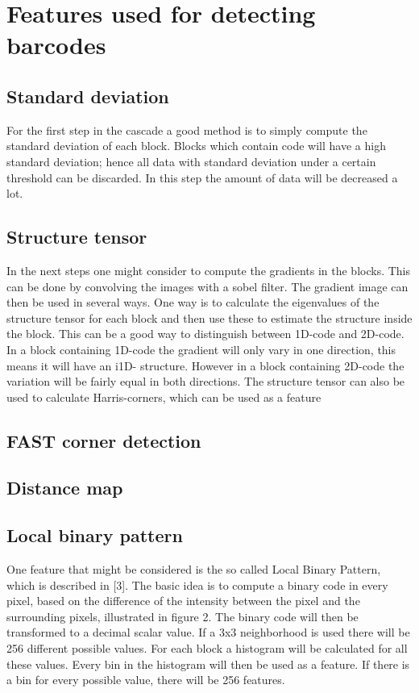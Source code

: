 \chapter{Features used for detecting barcodes}
\label{sec:Features used for detecting barcodes}

\section{Standard deviation}
\label{sec:Standard deviation}
For the first step in the cascade a good method is to simply compute the standard deviation of each block. Blocks which contain code will have a high standard deviation; hence all data with standard deviation under a certain threshold can be discarded. In this step the amount of data will be decreased a lot. 

\section{Structure tensor}
\label{sec:Structure tensor}
In the next steps one might consider to compute the gradients in the blocks. This can be done by convolving the images with a sobel filter. The gradient image can then be used in several ways. One way is to calculate the eigenvalues of the structure tensor for each block and then use these to estimate the
structure inside the block. This can be a good way to distinguish between 1D-code and 2D-code.  In a block containing 1D-code the gradient will only vary in one direction, this means it will have an i1D- structure. However in a block containing 2D-code the variation will be fairly equal in both directions. The structure tensor can also be used to calculate Harris-corners, which can be used as a feature

\section{FAST corner detection}
\label{sec:FAST corner detection}

\section{Distance map}
\label{sec:Distance map}

\section{Local binary pattern}
\label{sec:Local binary pattern}
One feature that might be considered is the so called Local Binary Pattern, which is described in [3]. The basic idea is to compute a binary code in every pixel, based on the difference of the intensity between the pixel and the surrounding pixels, illustrated in figure 2. The binary code will then be transformed to a decimal scalar value. If a 3x3 neighborhood is used there will be 256 different possible values. For each block a histogram will be calculated for all these values. Every bin in the histogram will then be used as a feature. If there is a bin for every possible value, there will be 256 features.
